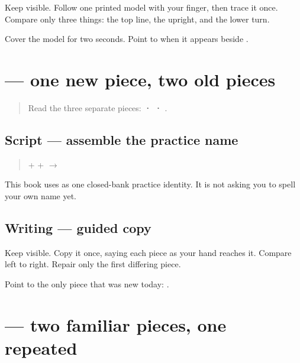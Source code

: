 Keep \textbf{} visible. Follow one printed model with your finger, then trace it once. Compare only three things: the top line, the upright, and the lower turn.

\begin{tcolorbox}[breakable,colback=teal!4,colframe=teal!35!black,title={Before you move on}]
Cover the model for two seconds. Point to \textbf{} when it appears beside \textbf{}.
\end{tcolorbox}
\section[\texorpdfstring{\pa{ਅਮਨ} (Aman)}{ਅਮਨ (Aman)}]{ — one new piece, two old pieces}

\label{lesson:PA-W02-aman}



\begin{quote}
Read the three separate pieces: \textbf{ ·  · }.
\end{quote}

\subsection*{Script — assemble the practice name}
\begin{quote}
\textbf{} + \textbf{} + \textbf{} $\to$ \textbf{}
\end{quote}

This book uses \textbf{} as one closed-bank practice identity. It is not asking you to spell your own name yet.

\subsection*{Writing — guided copy}

Keep \textbf{} visible. Copy it once, saying each piece as your hand reaches it. Compare left to right. Repair only the first differing piece.

\begin{tcolorbox}[breakable,colback=teal!4,colframe=teal!35!black,title={Before you move on}]
Point to the only piece that was new today: \textbf{}.
\end{tcolorbox}
\section[\texorpdfstring{\pa{ਮਨਨ} (Manan)}{ਮਨਨ (Manan)}]{ — two familiar pieces, one repeated}

